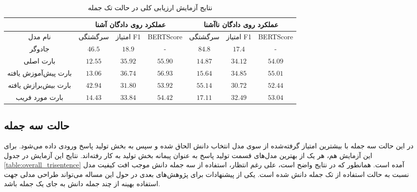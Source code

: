 \begin{table}[ht]
	\caption{نتایج آزمایش ارزیابی کلی در حالت تک جمله}
	\label{table:overall_unisentence}
	\begin{tabular}{|c|c|c|c|c|c|c|}
		\hline
		& \multicolumn{3}{c|}{عملکرد روی دادگان آشنا}            & \multicolumn{3}{c|}{عملکرد روی دادگان نا‌آشنا}         \\ \hline
		نام مدل              & سرگشتگی          & امتیاز F1        & BERTScore        & سرگشتگی          & امتیاز F1        & BERTScore        \\ \hline
		جادوگر               & $46.5$           & $18.9$           & -                & $84.8$           & $17.4$           & -                \\ \hline
		بارت اصلی            & $\mathbf{12.55}$ & $35.92$          & $55.90$          & $\mathbf{14.87}$ & $34.12$          & $54.09$          \\ \hline
		بارت پیش‌آموزش یافته & $13.06$          & $\mathbf{36.74}$ & $\mathbf{56.93}$ & $15.64$          & $\mathbf{34.85}$ & $\mathbf{55.01}$ \\ \hline
		بارت بیش‌برازش یافته & $42.94$          & $31.80$          & $53.92$          & $55.14$          & $30.72$          & $52.44$          \\ \hline
		بارت مورد فریب       & $14.43$          & $33.84$          & $54.42$          & $17.11$          & $32.49$          & $53.04$          \\ \hline
	\end{tabular}
\end{table}


\subsection{حالت سه جمله}
 در این حالت سه جمله با بیشترین امتیاز گرفته‌شده از سوی مدل انتخاب دانش
 الحاق شده و سپس  به بخش تولید پاسخ ورودی داده می‌شود. برای این آزمایش هم، هر یک از بهترین مدل‌های قسمت تولید پاسخ به عنوان پیمانه بخش تولید به کار رفته‌اند. نتایج این آزمایش در جدول 
 \ref{table:overall_trisentence} 
 آمده است. همانطور که در نتایج واضح است، علی رغم انتظار، استفاده از سه جمله دانش موجب افت کیفیت مدل نسبت به حالت استفاده از تک جمله دانش شده است. یکی از پیشنهادات برای پژوهش‌های بعدی در حول این مساله می‌تواند طراحی مدلی جهت استفاده بهینه از چند جمله دانش به جای یک جمله باشد. 
 
